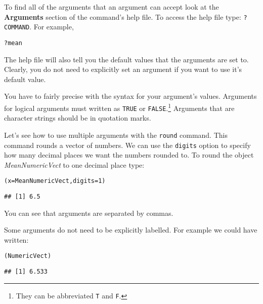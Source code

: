 To find all of the arguments that an argument can accept look at the {\bf{Arguments}} section of the command's help file. To access the help file type: \texttt{?COMMAND}. For example,

\begin{knitrout}
\color{fgcolor}\begin{kframe}
\begin{alltt}
?mean
\end{alltt}
\end{kframe}
\end{knitrout}


\noindent The help file will also tell you the default values that the arguments are set to. Clearly, you do not need to explicitly set an argument if you want to use it's default value.

You have to fairly precise with the syntax for your argument's values. Arguments for logical arguments must written as \texttt{TRUE} or \texttt{FALSE}.\footnote{They can be abbreviated \texttt{T} and \texttt{F}.} Arguments that are character strings should be in quotation marks.

Let's see how to use multiple arguments with the \texttt{round} command. This command rounds a vector of numbers. We can use the \texttt{digits} option to specify how many decimal places we want the numbers rounded to. To round the object \emph{MeanNumericVect} to one decimal place type:

\begin{knitrout}
\color{fgcolor}\begin{kframe}
\begin{alltt}
(x = MeanNumericVect, digits = 1)
\end{alltt}
\begin{verbatim}
## [1] 6.5
\end{verbatim}
\end{kframe}
\end{knitrout}


\noindent You can see that arguments are separated by commas. 

Some arguments do not need to be explicitly labelled. For example we could have written:

\begin{knitrout}
\color{fgcolor}\begin{kframe}
\begin{alltt}
(NumericVect)
\end{alltt}
\begin{verbatim}
## [1] 6.533
\end{verbatim}
\end{kframe}
\end{knitrout}


